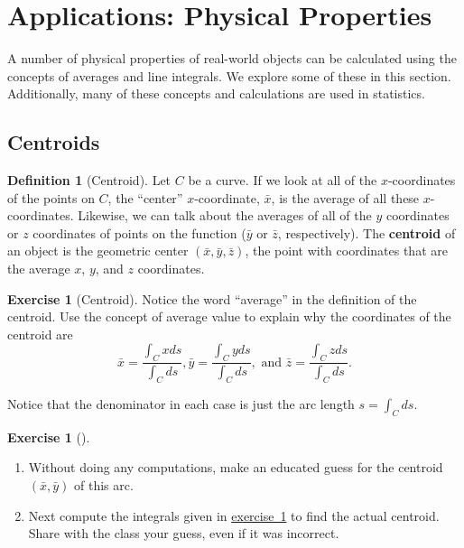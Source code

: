 \documentclass[10pt,]{book}
\newcommand{\terminology}[1]{\textbf{#1}}
\theoremstyle{plain}
\theoremstyle{definition}
\newtheorem{definition}[theorem]{Definition}
\theoremstyle{definition}
\theoremstyle{definition}
\theoremstyle{definition}
\newtheorem{exploration}[project]{Exercise}
\theoremstyle{definition}
\numberwithin{equation}{section}
\begin{document}
\section[{Applications: Physical Properties}]{Applications: Physical Properties}\label{section-33}
A number of physical properties of real-world objects can be calculated using the concepts of averages and line integrals. We explore some of these in this section. Additionally, many of these concepts and calculations are used in statistics.%
\typeout{************************************************}
\typeout{************************************************}
\subsection[{Centroids}]{Centroids}\label{subsection-29}
\begin{definition}[{Centroid}]\label{definition-37}
Let \(C\) be a curve. If we look at all of the \(x\)-coordinates of the points on \(C\), the ``center'' \(x\)-coordinate, \(\bar x\), is the average of all these \(x\)-coordinates. Likewise, we can talk about the averages of all of the \(y\) coordinates or \(z\) coordinates of points on the function (\(\bar y\) or \(\bar z\), respectively). The \terminology{centroid} of an object is the geometric center \((\bar x, \bar y, \bar z)\), the point with coordinates that are the average \(x\), \(y\), and \(z\) coordinates.%
\end{definition}
\begin{exploration}[Centroid]\label{prob_centroid_of_curve}
Notice the word ``average'' in the definition of the centroid. Use the concept of average value to explain why the coordinates of the centroid are %
\begin{equation*}
\bar x = \frac{\int_C x ds}{\int_C  ds},
\bar y = \frac{\int_C y ds}{\int_C  ds}, 
\text{ and } 
\bar z = \frac{\int_C z ds}{\int_C  ds}.
\end{equation*}
%
\par
Notice that the denominator in each case is just the arc length \(s=\int_C ds\).%
\end{exploration}
\begin{exploration}[]\label{prob_semicircle_centroid}
\leavevmode%
\begin{enumerate}[font=\bfseries,label=(\alph*),ref=\alph*]
\item\label{task-557} Without doing any computations, make an educated guess for the centroid \((\bar x, \bar y)\) of this arc.%
\item\label{task-558} Next compute the integrals given in \hyperref[prob_centroid_of_curve]{exercise~1} to find the actual centroid. Share with the class your guess, even if it was incorrect.%
\end{enumerate}
\end{exploration}
\typeout{************************************************}
\typeout{************************************************}
\end{document}

